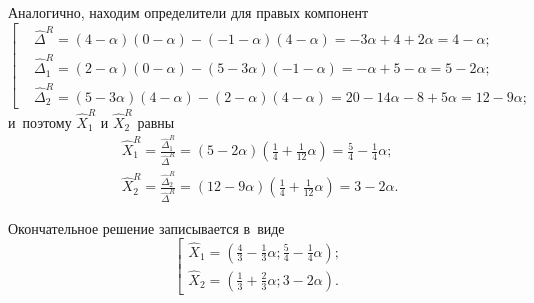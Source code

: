 Аналогично, находим определители для правых компонент
\begin{equation*}
  \left[ \begin{aligned}
    & \hat \Delta^R = \left(4-\alpha \right) \left(0-\alpha \right) - \left(-1-\alpha \right) \left(4-\alpha \right) = -3\alpha+4+2\alpha = 4-\alpha; \\
    & \hat \Delta_1^R = \left(2-\alpha \right) \left(0-\alpha \right) - \left(5-3\alpha \right) \left(-1-\alpha \right) = -\alpha+5-\alpha = 5-2\alpha; \\
    & \hat \Delta_2^R = \left(5-3\alpha \right) \left(4-\alpha \right) - \left(2-\alpha \right) \left(4-\alpha \right) = 20-14\alpha-8+5\alpha=12-9\alpha;
  \end{aligned} \right.
\end{equation*}
и~поэтому $\hat X_1^R$ и $\hat X_2^R$ равны
\begin{gather*}
  \hat X_1^R = \frac{\hat \Delta_1^R}{\hat \Delta^R} = \left(5-2\alpha \right) \left(\frac{1}{4}+\frac{1}{12}\alpha \right) = \frac{5}{4}-\frac{1}{4}\alpha; \\
  \hat X_2^R = \frac{\hat \Delta_2^R}{\hat \Delta^R} = \left(12-9\alpha \right) \left(\frac{1}{4}+\frac{1}{12}\alpha \right) = 3-2\alpha.
\end{gather*}

Окончательное решение записывается в~виде
\begin{equation*}
  \left[ \begin{aligned}
    \hat X_1 = \left(\frac{4}{3} - \frac{1}{3}\alpha; \frac{5}{4}-\frac{1}{4}\alpha \right); \\
    \hat X_2 = \left(\frac{1}{3} + \frac{2}{3}\alpha; 3-2\alpha \right).
  \end{aligned} \right.
\end{equation*}